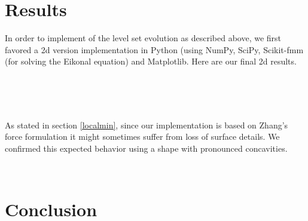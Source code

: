 \documentclass{article}
\begin{document}
\section{Results}
In order to implement of the level set evolution as described above, we first
favored a 2d version implementation in Python (using NumPy, SciPy, Scikit-fmm
(for solving the Eikonal equation) and Matplotlib. Here are our final 2d
results.
\begin{figure}[H]
  \centering
  ~
   \\
  ~
   \\
   ~
\end{figure}

As stated in section \ref{localmin}, since our implementation is based on
Zhang's force formulation it might sometimes suffer from loss of surface
details. We confirmed this expected behavior using a shape with pronounced
concavities.

\begin{figure}[H]
  \centering
  ~
\end{figure}


\section{Conclusion}



\end{document}
